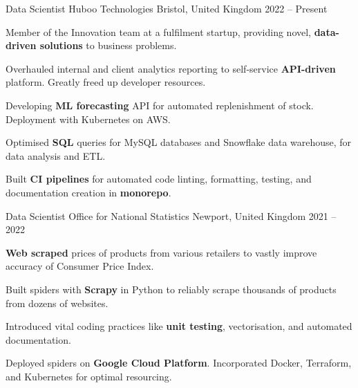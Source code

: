 
\begin{cventries}

        \cventry
        {Data Scientist} %
        {Huboo Technologies} %
        {Bristol, United Kingdom} %
        {2022 -- Present} %
        {
            \begin{cvitems} %
                \item{Member of the Innovation team at a fulfilment startup, providing novel, \textbf{data-driven solutions} to business problems.}
                \item{Overhauled internal and client analytics reporting to self-service \textbf{API-driven} platform. Greatly freed up developer resources.}
                \item{Developing \textbf{ML forecasting} API for automated replenishment of stock. Deployment with Kubernetes on AWS.}
                \item{Optimised \textbf{SQL} queries for MySQL databases and Snowflake data warehouse, for data analysis and ETL.}
                \item{Built \textbf{CI pipelines} for automated code linting, formatting, testing, and documentation creation in \textbf{monorepo}.}
            \end{cvitems}
        }

    \cventry
        {Data Scientist} %
        {Office for National Statistics} %
        {Newport, United Kingdom} %
        {2021 -- 2022} %
        {
            \begin{cvitems} %
                \item{\textbf{Web scraped} prices of products from various retailers to vastly improve accuracy of Consumer Price Index.}
                \item{Built spiders with \textbf{Scrapy} in Python to reliably scrape thousands of products from dozens of websites.}
                \item{Introduced vital coding practices like \textbf{unit testing}, vectorisation, and automated documentation.}
                \item{Deployed spiders on \textbf{Google Cloud Platform}. Incorporated Docker, Terraform, and Kubernetes for optimal resourcing.}
            \end{cvitems}
        }


\end{cventries}

